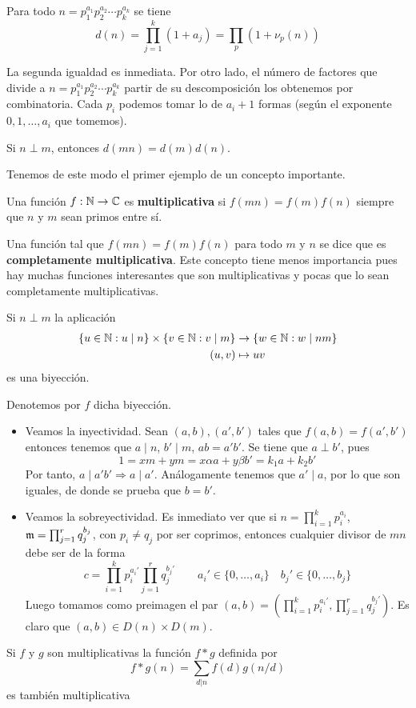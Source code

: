 \documentclass[TAN.tex]{subfiles}
\begin{document}
\begin{prop}
Para todo $n = p_1^{a_1}p_2^{a_2}\cdots p_k^{a_k}$ se tiene
\[ d(n) = \prod_{j=1}^k (1+a_j) = \prod_p (1+ν_p(n)) \]
\end{prop}
\begin{dem}
La segunda igualdad es inmediata. Por otro lado, el número de factores que divide a $n = p_1^{a_1}p_2^{a_2}\cdots p_k^{a_k}$  partir de su descomposición los obtenemos por combinatoria. Cada $p_i$ podemos tomar lo de $a_i+1$ formas (según el exponente $0,1,\dotsc,a_i$ que tomemos).
\end{dem}
\begin{coro}
Si $n \perp m$, entonces $d(mn) = d(m)d(n)$.
\end{coro}

Tenemos de este modo el primer ejemplo de un concepto importante.

\begin{defi}
Una función $f : \mathbb{N} \to \mathbb{C}$ es \textbf{multiplicativa} si $f(mn) = f(m)f(n)$ siempre que $n$ y $m$ sean primos entre sí.

Una función tal que $f(mn)=f(m)f(n)$ para todo $m$ y $n$ se dice que es \textbf{completamente multiplicativa}.
Este concepto tiene menos importancia pues hay muchas funciones interesantes que son multiplicativas y pocas que lo sean completamente multiplicativas.
\end{defi}

\begin{prop}
Si $n \perp m$ la aplicación
\begin{align*}
	\{ u \in \mathbb{N} : u \mid n\} \times \{v \in \mathbb{N} : v \mid m\} & \rightarrow \{ w \in \mathbb{N} : w \mid nm \}\\
	(u,v) & \mapsto uv
\end{align*}
es una biyección.
\end{prop}
\begin{dem}
Denotemos por $f$ dicha biyección. 
\begin{itemize} 
\item Veamos la inyectividad. Sean $(a,b),(a',b')$ tales que $f(a,b)=f(a',b')$ entonces tenemos que $a\mid n$, $b'\mid m$, $ab=a'b'$. Se tiene que $a\perp b'$, pues
$$
1=xm+ym = x\alpha a + y\beta b' = k_1 a + k_2 b'
$$
Por tanto, $a\mid a'b' \Rightarrow a\mid a'$. Análogamente tenemos que $a'\mid a$, por lo que son iguales, de donde se prueba que $b=b'$. 
\item Veamos la sobreyectividad. Es inmediato ver que si $n=\prod_{i=1}^k p_i ^{a_i}$, ${\mathfrak{m}}=\prod_{j=1}^r q_j^{b_j}$, con $p_i \neq q_j$ por ser coprimos, entonces cualquier divisor de $mn$ debe ser de la forma
$$
c = \prod_{i=1}^k p_i ^{a_i'}\prod_{j=1}^r q_j^{b_j'} \qquad a_i' \in \{0,\dotsc,a_i\} \quad b_j' \in \{0,\dotsc,b_j\}
$$
Luego tomamos como preimagen el par $(a,b) = (\prod_{i=1}^k p_i ^{a_i'},\prod_{j=1}^r q_j^{b_j'})$. Es claro que $(a,b) \in D(n)\times D(m)$.
\end{itemize}
\end{dem}
\begin{prop} Si $f$ y $g$ son multiplicativas la función $f * g$ definida por
\[ f * g (n) = \sum_{d|n} f(d)g(n/d) \]
es también multiplicativa
\end{prop}
\end{document}
